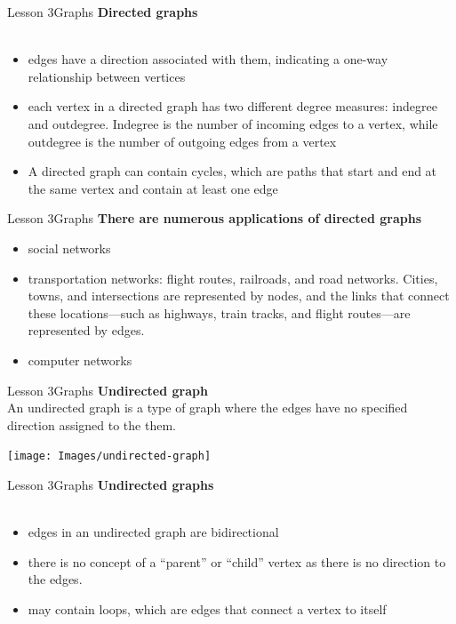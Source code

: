 \documentclass[aspectratio=1610]{beamer}
\begin{document}
\begin{frame}{Lesson 3}{Graphs}
\LARGE
\textbf{Directed graphs}\\~\\
\Large
\begin{itemize}
	\item edges have a direction associated with them, indicating a one-way relationship between vertices
	\item each vertex in a directed graph has two different degree measures: indegree and outdegree. Indegree is the number of incoming edges to a vertex, while outdegree is the number of outgoing edges from a vertex
	\item A directed graph can contain cycles, which are paths that start and end at the same vertex and contain at least one edge
\end{itemize}
\end{frame}


\begin{frame}{Lesson 3}{Graphs}
\LARGE
\textbf{There are numerous applications of directed graphs}\\
\Large
\begin{itemize}
    \item social networks
    \item transportation networks: flight routes, railroads, and road networks. Cities, towns, and intersections are represented by nodes, and the links that connect these locations—such as highways, train tracks, and flight routes—are represented by edges.
    \item computer networks
\end{itemize}
\end{frame}


\begin{frame}{Lesson 3}{Graphs}
\LARGE
\textbf{Undirected graph}\\
An undirected graph is a type of graph where the edges have no
specified direction assigned to the them.
\begin{center}
\texttt{[image: Images/undirected-graph]}
\end{center}
\end{frame}


\begin{frame}{Lesson 3}{Graphs}
\LARGE
\textbf{Undirected graphs}\\~\\
\Large
\begin{itemize}
	\item edges in an undirected graph are bidirectional
	\item there is no concept of a “parent” or “child” vertex as there is no direction to the edges.
	\item may contain loops, which are edges that connect a vertex to itself
\end{itemize}
\end{frame}
\end{document}
